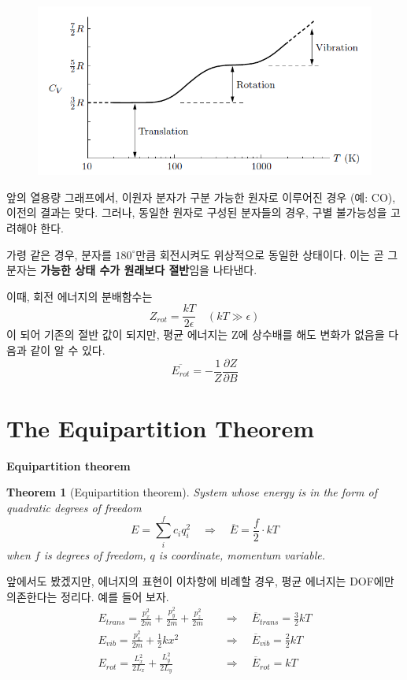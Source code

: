 \documentclass{article}
\newtheorem{theorem}{Theorem}
\begin{document}
\begin{figure}[h]
    \centering
    \includegraphics[width=0.65\linewidth]{images/fig2_3.png}
\end{figure}

\newpage

앞의 열용량 그래프에서, 이원자 분자가 구분 가능한 원자로 이루어진 경우 (예: CO), 이전의 결과는 맞다. 그러나, 동일한 원자로 구성된 분자들의 경우, 구별 불가능성을 고려해야 한다.

가령 같은 경우, 분자를 $180^\circ$만큼 회전시켜도 위상적으로 동일한 상태이다. 이는 곧 그 분자는 \textbf{가능한 상태 수가 원래보다 절반}임을 나타낸다.

이때, 회전 에너지의 분배함수는
\begin{equation}
    Z_{rot} = \frac{kT}{2 \epsilon} \quad (kT \gg \epsilon)
\end{equation}
이 되어 기존의 절반 값이 되지만, 평균 에너지는 Z에 상수배를 해도 변화가 없음을 다음과 같이 알 수 있다.
\begin{equation}
    \overline{E_{rot}} = -\frac{1}{Z} \frac{\partial Z}{\partial B}
\end{equation}

\section{The Equipartition Theorem}

\textbf{Equipartition theorem}

\begin{theorem}[Equipartition theorem]
    System whose energy is in the form of quadratic degrees of freedom
    \begin{equation}
        E = \sum_i^f c_i q_i^2 \quad \Rightarrow \quad \overline{E} = \frac{f}{2} \cdot kT
    \end{equation}
    when $f$ is degrees of freedom, $q$ is coordinate, momentum variable.
\end{theorem}

앞에서도 봤겠지만, 에너지의 표현이 이차항에 비례할 경우, 평균 에너지는 DOF에만 의존한다는 정리다. 예를 들어 보자.
\begin{align}
    E_{trans} = \frac{p_x^2}{2m} + \frac{p_y^2}{2m} + \frac{p_z^2}{2m} \quad &\Rightarrow \quad \overline{E}_{trans} = \frac32 kT\\
    E_{vib} = \frac{p_x^2}{2m} + \frac12 kx^2 \quad &\Rightarrow \quad \overline{E}_{vib} = \frac22 kT\\
    E_{rot} = \frac{L_x^2}{2L_x} + \frac{L_y^2}{2L_y} \quad &\Rightarrow \quad \overline{E}_{rot} = kT
\end{align}
\end{document}
